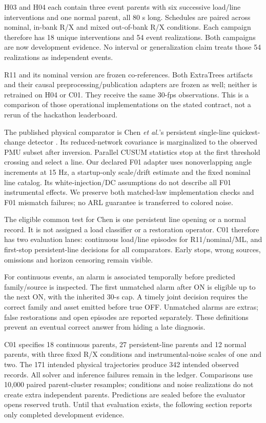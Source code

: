 H03 and H04 each contain three event parents with six successive load/line interventions and one normal parent, all 80 s long. Schedules are paired across nominal, in-bank R/X and mixed out-of-bank R/X conditions. Each campaign therefore has 18 unique interventions and 54 event realizations. Both campaigns are now development evidence. No interval or generalization claim treats those 54 realizations as independent events.

R11 and its nominal version are frozen co-references. Both ExtraTrees artifacts and their causal preprocessing/publication adapters are frozen as well; neither is retrained on H04 or C01. They receive the same 30-fps observations. This is a comparison of those operational implementations on the stated contract, not a rerun of the hackathon leaderboard.

The published physical comparator is Chen \emph{et al.}'s persistent single-line quickest-change detector \cite{chen2016quickest}. Its reduced-network covariance is marginalized to the observed PMU subset after inversion. Parallel CUSUM statistics stop at the first threshold crossing and select a line. Our declared F01 adapter uses nonoverlapping angle increments at 15 Hz, a startup-only scale/drift estimate and the fixed nominal line catalog. Its white-injection/DC assumptions do not describe all F01 instrumental effects. We preserve both matched-law implementation checks and F01 mismatch failures; no ARL guarantee is transferred to colored noise.

The eligible common test for Chen is one persistent line opening or a normal record. It is not assigned a load classifier or a restoration operator. C01 therefore has two evaluation lanes: continuous load/line episodes for R11/nominal/ML, and first-stop persistent-line decisions for all comparators. Early stops, wrong sources, omissions and horizon censoring remain visible.

For continuous events, an alarm is associated temporally before predicted family/source is inspected. The first unmatched alarm after ON is eligible up to the next ON, with the inherited 30-s cap. A timely joint decision requires the correct family and asset emitted before true OFF. Unmatched alarms are extras; false restorations and open episodes are reported separately. These definitions prevent an eventual correct answer from hiding a late diagnosis.

C01 specifies 18 continuous parents, 27 persistent-line parents and 12 normal parents, with three fixed R/X conditions and instrumental-noise scales of one and two. The 171 intended physical trajectories produce 342 intended observed records. All solver and inference failures remain in the ledger. Comparisons use 10,000 paired parent-cluster resamples; conditions and noise realizations do not create extra independent parents. Predictions are sealed before the evaluator opens reserved truth. Until that evaluation exists, the following section reports only completed development evidence.

